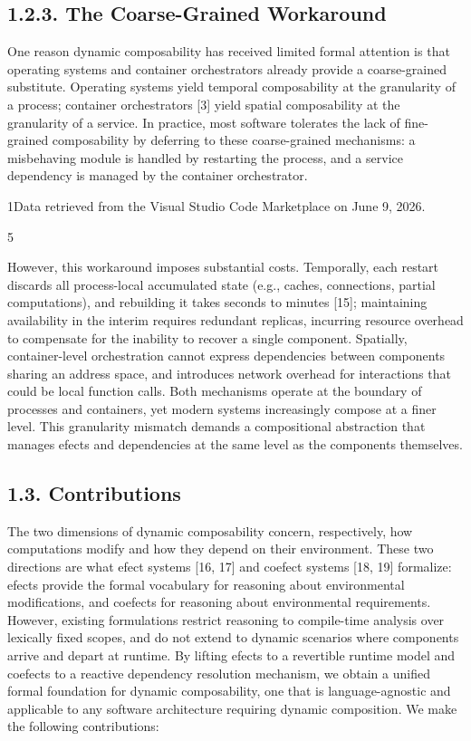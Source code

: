 \documentclass[
  10
]{article}
\begin{document}
\subsection{1.2.3. The Coarse-Grained
Workaround}\label{the-coarse-grained-workaround}

One reason dynamic composability has received limited formal attention
is that operating systems and container orchestrators already provide a
coarse-grained substitute. Operating systems yield temporal
composability at the granularity of a process; container orchestrators
{[}3{]} yield spatial composability at the granularity of a service. In
practice, most software tolerates the lack of fine-grained composability
by deferring to these coarse-grained mechanisms: a misbehaving module is
handled by restarting the process, and a service dependency is managed
by the container orchestrator.

1Data retrieved from the Visual Studio Code Marketplace on June 9, 2026.

5

However, this workaround imposes substantial costs. Temporally, each
restart discards all process-local accumulated state (e.g., caches,
connections, partial computations), and rebuilding it takes seconds to
minutes {[}15{]}; maintaining availability in the interim requires
redundant replicas, incurring resource overhead to compensate for the
inability to recover a single component. Spatially, container-level
orchestration cannot express dependencies between components sharing an
address space, and introduces network overhead for interactions that
could be local function calls. Both mechanisms operate at the boundary
of processes and containers, yet modern systems increasingly compose at
a finer level. This granularity mismatch demands a compositional
abstraction that manages efects and dependencies at the same level as
the components themselves.

\subsection{1.3. Contributions}\label{contributions}

The two dimensions of dynamic composability concern, respectively, how
computations modify and how they depend on their environment. These two
directions are what efect systems {[}16, 17{]} and coefect systems
{[}18, 19{]} formalize: efects provide the formal vocabulary for
reasoning about environmental modifications, and coefects for reasoning
about environmental requirements. However, existing formulations
restrict reasoning to compile-time analysis over lexically fixed scopes,
and do not extend to dynamic scenarios where components arrive and
depart at runtime. By lifting efects to a revertible runtime model and
coefects to a reactive dependency resolution mechanism, we obtain a
unified formal foundation for dynamic composability, one that is
language-agnostic and applicable to any software architecture requiring
dynamic composition. We make the following contributions:
\end{document}
